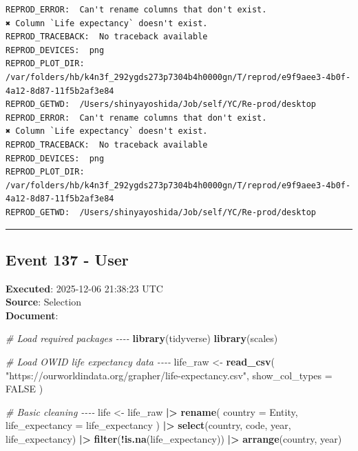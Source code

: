 \documentclass[
  11pt,
]{article}
\newenvironment{Shaded}{\begin{snugshade}}{\end{snugshade}}
\newcommand{\AttributeTok}[1]{\textcolor[rgb]{0.13,0.29,0.53}{#1}}
\newcommand{\CommentTok}[1]{\textcolor[rgb]{0.56,0.35,0.01}{\textit{#1}}}
\newcommand{\ConstantTok}[1]{\textcolor[rgb]{0.56,0.35,0.01}{#1}}
\newcommand{\FunctionTok}[1]{\textcolor[rgb]{0.13,0.29,0.53}{\textbf{#1}}}
\newcommand{\NormalTok}[1]{#1}
\newcommand{\OtherTok}[1]{\textcolor[rgb]{0.56,0.35,0.01}{#1}}
\newcommand{\SpecialCharTok}[1]{\textcolor[rgb]{0.81,0.36,0.00}{\textbf{#1}}}
\newcommand{\StringTok}[1]{\textcolor[rgb]{0.31,0.60,0.02}{#1}}
\newenvironment{rpoutput}{\vspace{0.5em}\begin{snugshade}}{\end{snugshade}}
\begin{document}
\begin{rpoutput}

\begin{verbatim}
REPROD_ERROR:  Can't rename columns that don't exist.
✖ Column `Life expectancy` doesn't exist. 
REPROD_TRACEBACK:  No traceback available  
REPROD_DEVICES:  png 
REPROD_PLOT_DIR:  /var/folders/hb/k4n3f_292ygds273p7304b4h0000gn/T/reprod/e9f9aee3-4b0f-4a12-8d87-11f5b2af3e84 
REPROD_GETWD:  /Users/shinyayoshida/Job/self/YC/Re-prod/desktop 
REPROD_ERROR:  Can't rename columns that don't exist.
✖ Column `Life expectancy` doesn't exist. 
REPROD_TRACEBACK:  No traceback available  
REPROD_DEVICES:  png 
REPROD_PLOT_DIR:  /var/folders/hb/k4n3f_292ygds273p7304b4h0000gn/T/reprod/e9f9aee3-4b0f-4a12-8d87-11f5b2af3e84 
REPROD_GETWD:  /Users/shinyayoshida/Job/self/YC/Re-prod/desktop 
\end{verbatim}

\end{rpoutput}

\begin{center}\rule{0.5\linewidth}{0.5pt}\end{center}

\subsection{Event 137 - User}\label{event-137---user}

\textbf{Executed}: 2025-12-06 21:38:23 UTC\\
\textbf{Source}: Selection\\
\textbf{Document}:

\begin{Shaded}
\begin{Highlighting}[]
\CommentTok{\# Load required packages {-}{-}{-}{-}}
\FunctionTok{library}\NormalTok{(tidyverse)}
\FunctionTok{library}\NormalTok{(scales)}

\CommentTok{\# Load OWID life expectancy data {-}{-}{-}{-}}
\NormalTok{life\_raw }\OtherTok{\textless{}{-}} \FunctionTok{read\_csv}\NormalTok{(}
  \StringTok{"https://ourworldindata.org/grapher/life{-}expectancy.csv"}\NormalTok{,}
  \AttributeTok{show\_col\_types =} \ConstantTok{FALSE}
\NormalTok{)}

\CommentTok{\# Basic cleaning {-}{-}{-}{-}}
\NormalTok{life }\OtherTok{\textless{}{-}}\NormalTok{ life\_raw }\SpecialCharTok{|\textgreater{}}
  \FunctionTok{rename}\NormalTok{(}
    \AttributeTok{country =}\NormalTok{ Entity,}
    \AttributeTok{life\_expectancy =} \StringTok{\textasciigrave{}}\AttributeTok{life\_expectancy}\StringTok{\textasciigrave{}}
\NormalTok{  ) }\SpecialCharTok{|\textgreater{}}
  \FunctionTok{select}\NormalTok{(country, code, year, life\_expectancy) }\SpecialCharTok{|\textgreater{}}
  \FunctionTok{filter}\NormalTok{(}\SpecialCharTok{!}\FunctionTok{is.na}\NormalTok{(life\_expectancy)) }\SpecialCharTok{|\textgreater{}}
  \FunctionTok{arrange}\NormalTok{(country, year)}
\end{Highlighting}
\end{Shaded}
\end{document}
